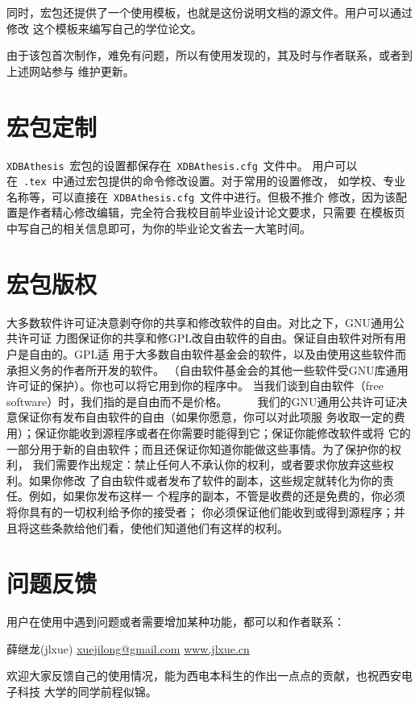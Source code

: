 同时，宏包还提供了一个使用模板，也就是这份说明文档的源文件。用户可以通过修改
这个模板来编写自己的学位论文。

由于该包首次制作，难免有问题，所以有使用发现的，其及时与作者联系，或者到上述网站参与
维护更新。


\section{宏包定制}

\texttt{XDBAthesis}~宏包的设置都保存在~\texttt{XDBAthesis.cfg}~文件中。
用户可以在\allowbreak~\texttt{.tex}~中通过宏包提供的命令修改设置。对于常用的设置修改，
如学校、专业名称等，可以直接在~\texttt{XDBAthesis.cfg}~文件中进行。但极不推介
修改，因为该配置是作者精心修改编辑，完全符合我校目前毕业设计论文要求，只需要
在模板页中写自己的相关信息即可，为你的毕业论文省去一大笔时间。

\section{宏包版权}
大多数软件许可证决意剥夺你的共享和修改软件的自由。对比之下，GNU通用公共许可证
力图保证你的共享和修GPL改自由软件的自由。保证自由软件对所有用户是自由的。GPL适
用于大多数自由软件基金会的软件，以及由使用这些软件而承担义务的作者所开发的软件。
（自由软件基金会的其他一些软件受GNU库通用许可证的保护）。你也可以将它用到你的程序中。
当我们谈到自由软件（free software）时，我们指的是自由而不是价格。
　　
我们的GNU通用公共许可证决意保证你有发布自由软件的自由（如果你愿意，你可以对此项服
务收取一定的费用）；保证你能收到源程序或者在你需要时能得到它；保证你能修改软件或将
它的一部分用于新的自由软件；而且还保证你知道你能做这些事情。为了保护你的权利，
我们需要作出规定：禁止任何人不承认你的权利，或者要求你放弃这些权利。如果你修改
了自由软件或者发布了软件的副本，这些规定就转化为你的责任。例如，如果你发布这样一
个程序的副本，不管是收费的还是免费的，你必须将你具有的一切权利给予你的接受者；
你必须保证他们能收到或得到源程序；并且将这些条款给他们看，使他们知道他们有这样的权利。

\section{问题反馈}

用户在使用中遇到问题或者需要增加某种功能，都可以和作者联系：

\begin{center}
薛继龙(jlxue) \quad \href{mailto:xuejilong@gmail.com}{xuejilong@gmail.com}\quad
\href{www.jlxue.cn}{www.jlxue.cn}
\end{center}

欢迎大家反馈自己的使用情况，能为西电本科生的作出一点点的贡献，也祝西安电子科技
大学的同学前程似锦。
